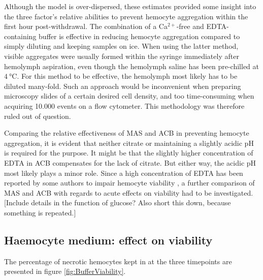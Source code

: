 Although the model is over-dispersed, these estimates provided some insight into the three factor's relative abilities to prevent hemocyte aggregation within the first hour post-withdrawal. The combination of a Ca$^{2+}$-free and EDTA-containing buffer is effective in reducing hemocyte aggregation compared to simply diluting and keeping samples on ice. When using the latter method, visible aggregates were usually formed within the syringe immediately after hemolymph aspiration, even though the hemolymph saline has been pre-chilled at $\SI{4}{\celsius}$. For this method to be effective, the hemolymph most likely has to be diluted many-fold. Such an approach would be inconvenient when preparing microscopy slides of a certain desired cell density, and too time-consuming when acquiring 10.000 events on a flow cytometer. This methodology was therefore ruled out of question.

Comparing the relative effectiveness of MAS and ACB in preventing hemocyte aggregation, it is evident that neither citrate or maintaining a slightly acidic pH is required for the purpose. It might be that the slightly higher concentration of EDTA in ACB compensates for the lack of citrate. But either way, the acidic pH most likely plays a minor role. Since a high concentration of EDTA has been reported by some authors to impair hemocyte viability \cite{Grandiosa2018, Burkhard2009}, a further comparison of MAS and ACB with regards to acute effects on viability had to be investigated. [Include details in the function of glucose? Also short this down, because something is repeated.]

\subsection{Haemocyte medium: effect on viability}
 The percentage of necrotic hemocytes kept in at the three timepoints are presented in figure \ref{fig:BufferViability}. \lipsum[2]

